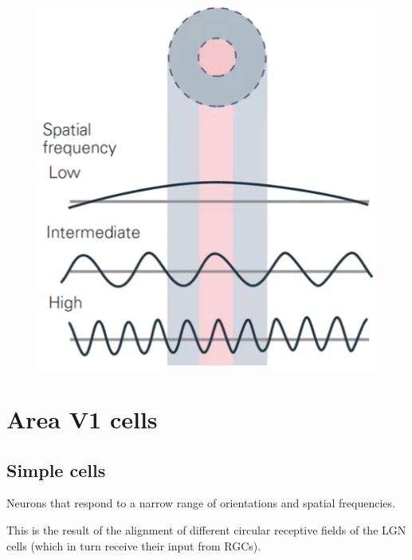 \begin{description}
\begin{description}
                \begin{figure}[H]
                    \centering
                    \includegraphics[width=0.2\linewidth]{./img/visual_frequencies.png}
                \end{figure}
        \end{description}
\end{description}



\section{Area V1 cells}


\subsection{Simple cells}

Neurons that respond to a narrow range of orientations and spatial frequencies.

This is the result of the alignment of different circular receptive fields of the LGN cells (which in turn receive their input from RGCs).

